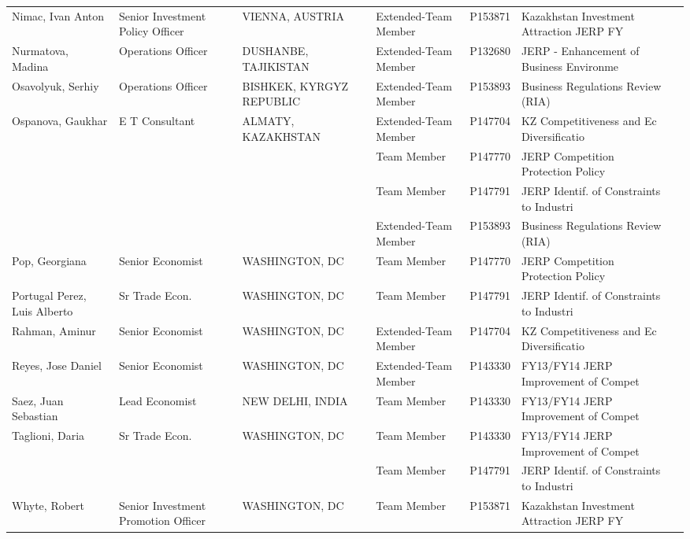 \documentclass{article}\usepackage[]{graphicx}\usepackage[]{color}
\begin{document}
\begin{minipage}[b]{0.99\textwidth}
{\begin{longtable}{>{\raggedright}p{1.4in}>{\raggedright}p{1in}>{\raggedright}p{1in}>{\raggedright}p{1in}l>{\raggedright}p{1.5in}l}
  Nimac, Ivan Anton & Senior Investment  Policy Officer & VIENNA, AUSTRIA & Extended-Team Member & P153871 & Kazakhstan Investment Attraction JERP FY &  \\ 
  Nurmatova, Madina & Operations Officer & DUSHANBE, TAJIKISTAN & Extended-Team Member & P132680 & JERP - Enhancement of Business Environme &  \\ 
  Osavolyuk, Serhiy & Operations Officer & BISHKEK, KYRGYZ REPUBLIC & Extended-Team Member & P153893 & Business Regulations Review (RIA) &  \\ 
  Ospanova, Gaukhar & E T Consultant & ALMATY, KAZAKHSTAN & Extended-Team Member & P147704 & KZ Competitiveness and Ec Diversificatio &  \\ 
   &  &  & Team Member & P147770 & JERP Competition Protection Policy &  \\ 
   &  &  & Team Member & P147791 & JERP Identif. of Constraints to Industri &  \\ 
   &  &  & Extended-Team Member & P153893 & Business Regulations Review (RIA) &  \\ 
  Pop, Georgiana & Senior Economist & WASHINGTON, DC & Team Member & P147770 & JERP Competition Protection Policy &  \\ 
  Portugal Perez, Luis Alberto & Sr Trade Econ. & WASHINGTON, DC & Team Member & P147791 & JERP Identif. of Constraints to Industri &  \\ 
  Rahman, Aminur & Senior Economist & WASHINGTON, DC & Extended-Team Member & P147704 & KZ Competitiveness and Ec Diversificatio &  \\ 
  Reyes, Jose Daniel & Senior Economist & WASHINGTON, DC & Extended-Team Member & P143330 & FY13/FY14 JERP Improvement of Compet &  \\ 
  Saez, Juan Sebastian & Lead Economist & NEW DELHI, INDIA & Team Member & P143330 & FY13/FY14 JERP Improvement of Compet &  \\ 
  Taglioni, Daria & Sr Trade Econ. & WASHINGTON, DC & Team Member & P143330 & FY13/FY14 JERP Improvement of Compet &  \\ 
   &  &  & Team Member & P147791 & JERP Identif. of Constraints to Industri &  \\ 
  Whyte, Robert & Senior Investment Promotion Officer & WASHINGTON, DC & Team Member & P153871 & Kazakhstan Investment Attraction JERP FY &  \\ 
  \hline
\end{longtable}
}

     \vspace*{0.5cm}
\end{minipage}

\end{document}
